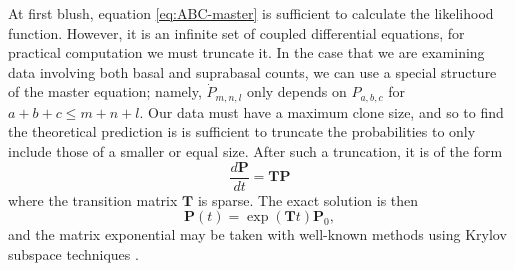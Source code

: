 \documentclass[10pt,english]{report}
\begin{document}
At first blush, equation \eqref{eq:ABC-master} is sufficient to calculate the likelihood function. However, it is an infinite set of coupled differential equations, for practical computation we must truncate it. In the case that we are examining data involving both basal and suprabasal counts, we can use a special structure of the master equation; namely, $\dot{P}_{m,n,l}$ only depends on $P_{a,b,c}$ for $a+b+c \le m+n+l$. Our data must have a maximum clone size, and so to find the theoretical prediction is is sufficient to truncate the probabilities to only include those of a smaller or equal size. After such a truncation, it is of the form $$\frac{d\mathbf{P}}{dt} = \mathbf{TP}$$ where the transition matrix $\mathbf{T}$ is sparse. The exact solution is then $$\mathbf{P}(t) = \exp\left(\mathbf{T}t\right) \mathbf{P}_0,$$ and the matrix exponential may be taken with well-known methods using Krylov subspace techniques \citep{expokit}.
\end{document}
